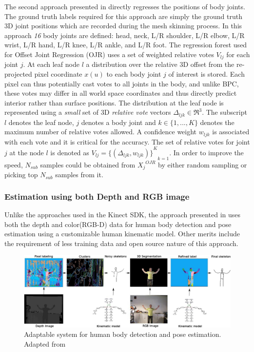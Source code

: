 The second approach presented in \cite{shotton2013efficient} directly regresses the positions of body joints. The ground truth labels required for this approach are simply the ground truth 3D joint positions which are recorded during the mesh skinning process. In this approach \emph{16} body joints are defined: head, neck, L/R shoulder, L/R elbow, L/R wrist, L/R hand, L/R knee, L/R ankle, and L/R foot. The regression forest used for Offset Joint Regression (OJR) uses a set of weighted relative votes $V_{lj}$ for each joint $j$. At each leaf node $l$ a distribution over the relative 3D offset from the re-projected pixel coordinate $x(u)$ to each body joint $j$ of interest is stored. Each pixel can thus potentially cast votes to all joints in the body, and unlike BPC, these votes may differ in all world space coordinates and thus directly predict interior rather than surface positions. The distribution at the leaf node is represented using a \emph{small} set of 3D \emph{relative vote} vectors $\Delta_{ljk} \in \Re^3$. The subscript $l$ denotes the leaf node, $j$ denotes a body joint and $k \in \lbrace 1,...,K \rbrace$ denotes the maximum number of relative votes allowed. A confidence weight $w_{ljk}$ is associated with each vote and it is critical for the accuracy. The set of relative votes for joint $j$ at the node $l$ is denoted as $V_{lj}={{\lbrace (\Delta_{ljk},w_{ljk}) \rbrace}^K}_{k=1}$. In order to improve the speed, $N_{sub}$ samples could be obtained from ${X_j}^{OJR}$ by either random sampling or picking top $N_{sub}$ samples from it. 
\subsubsection{Estimation using both Depth and RGB image}
Unlike the approaches used in the Kinect SDK, the approach presented in \cite{buys2014adaptable} uses both the depth and color(RGB-D) data for human body detection and pose estimation using a customizable human kinematic model. Other merits include the requirement of less training data and open source nature of this approach. 
\begin{figure}[H]
\centering
\includegraphics[width=\textwidth]{assets/adaptable_system_rgbd.png}
\caption[Adaptable system for human body detection and pose estimation]{Adaptable system for human body detection and pose estimation. {Adapted from \cite{buys2014adaptable}}}
\label{fig:adaptable_rgbd}
\end{figure}

